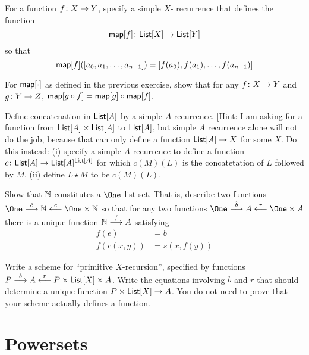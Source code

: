 \begin{exercises}
	\begin{nextexercise}
		\item For a function ${f}\colon{X}\to{Y}$, specify a simple $X$- recurrence that defines the function
			\[{\mathord{\textsf{map}}[f]}\colon{\mathord{\textsf{List}}[X]}\to{\mathord{\textsf{List}}[Y]}\] so that \[\mathord{\textsf{map}}[f]([a_0,a_1,\ldots, a_{n-1}]) = [f(a_0),f(a_1),\ldots, f(a_{n-1})]\]
		\item For $\mathord{\textsf{map}}[\cdot]$ as defined in the previous exercise, show that for any ${f}\colon{X}\to{Y}$ and ${g}\colon{Y}\to{Z}$, $\mathord{\textsf{map}}[g\circ f] = \mathord{\textsf{map}}[g]\circ \mathord{\textsf{map}}[f]$.
		\item Define concatenation in $\mathord{\textsf{List}}[A]$ by a simple $A$ recurrence. [Hint: I am asking for a function from $\mathord{\textsf{List}}[A]\times \mathord{\textsf{List}}[A]$ to $\mathord{\textsf{List}}[A]$, but simple $A$ recurrence alone will not do the job, because that can only define a function $\mathord{\textsf{List}}[A]\to X$ for some  $X$. Do this instead: (i) specify a simple $A$-recurrence to define a function ${c}\colon{\mathord{\textsf{List}}[A]}\to{\mathord{\textsf{List}}[A]^{\mathord{\textsf{List}}[A]}}$ for which $c(M)(L)$ is the concatetation of $L$ followed by $M$, (ii) define $L\star M$ to be $c(M)(L)$.
		\item Show that $\mathbb N$ constitutes a $\One$-list set. That is, 
		describe two functions $\One\stackrel{\hat{e}}{\longrightarrow}\NN\stackrel{c}{\longleftarrow}\One\times \NN$ so that for any two functions $\One\stackrel{\hat{b}}{\longrightarrow}A\stackrel{r}{\longleftarrow}\One\times A$ there is a unique function $\mathbb N\stackrel{f}{\longrightarrow}A$
		satisfying
		\begin{align*}
			f(e) &= b\\
			f(c(x,y)) &= s(x,f(y)) 
		\end{align*}
		\item Write a scheme for ``primitive $X$-recursion'', specified by functions $P\stackrel{b}{\longrightarrow}A\stackrel{r}{\longleftarrow}P\times \mathord{\textsf{List}}[X]\times A$. Write the equations involving $b$ and $r$ that should determine a unique function $P\times \mathord{\textsf{List}}[X]\to A$. 
		You do not need to prove that your scheme actually defines a function.
	\end{nextexercise}
\end{exercises}

\chapter{Powersets}

\begin{goals}
	
\end{goals}

